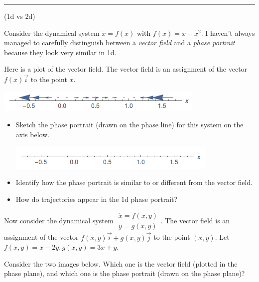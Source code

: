 \documentclass[12pt,letterpaper,noanswers]{exam}
\begin{document}
\hrule
\vspace{0.2cm}

\eject

\begin{questions}
\item (1d vs 2d)
\begin{parts}
    \item Consider the dynamical system $\dot{x} = f(x)$ with $f(x) = x - x^2$.  I haven't always managed to carefully distinguish between a \emph{vector field} and a \emph{phase portrait} because they look very similar in 1d.
    
    Here is a plot of the vector field.  The vector field is an assignment of the vector $f(x)\vec i$ to the point $x$. 
    
    \includegraphics{img/S19-C071dvector.png}
    
    \begin{itemize}
        \item Sketch the phase portrait (drawn on the phase line) for this system on the axis below.
        
        \includegraphics{img/S19-C07-1daxis.png}
        \item Identify how the phase portrait is similar to or different from the vector field.
        \item How do trajectories appear in the 1d phase portrait?
    \end{itemize}
\item Now consider the dynamical system $\begin{array}{c} \dot{x} = f(x,y) \\ \dot{y} = g(x,y)\end{array}$.  The vector field is an assignment of the vector $f(x,y)\vec i + g(x,y)\vec j$ to the point $(x,y)$.  Let $f(x,y) = x-2y, g(x,y) = 3x+y.$

Consider the two images below.  Which one is the vector field (plotted in the phase plane), and which one is the phase portrait (drawn on the phase plane)?


\end{parts}
\end{questions}
\end{document}
